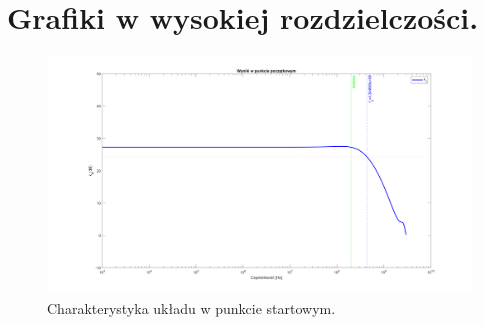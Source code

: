 \documentclass{article}
\begin{document}


\pagebreak









\clearpage
\section{Grafiki w wysokiej rozdzielczości.}


\begin{landscape}
	\begin{figure}[h]
		\vspace*{-2cm}
		\includegraphics[width=25cm,height=15 cm]{graphics/starting_point.png}
		\centering
		\caption{Charakterystyka układu w punkcie startowym.}
	\end{figure}
\end{landscape}
\end{document}
